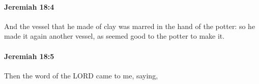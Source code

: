 		\paragraph{Jeremiah 18:4} %
			\label{JEREMIAH-18-4}

			And the vessel that he made of clay was marred in the hand of the potter: so he made it again another vessel, as seemed good to the potter to make it.


		\paragraph{Jeremiah 18:5} %
			\label{JEREMIAH-18-5}

			Then the word of the LORD came to me, saying,


